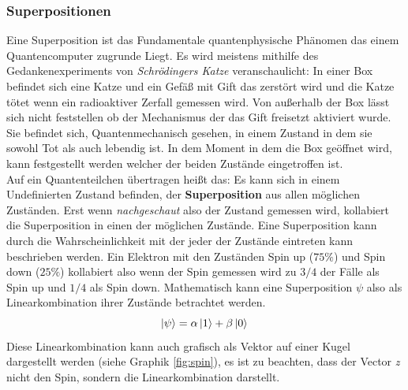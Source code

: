 \subsubsection{Superpositionen}
Eine Superposition ist das Fundamentale quantenphysische Phänomen das einem Quantencomputer zugrunde Liegt.
Es wird meistens mithilfe des Gedankenexperiments von \cite[\$5]{schrodinger_gegenwartige_1935} \textit{Schrödingers Katze} veranschaulicht: In einer Box befindet sich eine Katze und ein Gefäß mit Gift das zerstört wird und die Katze tötet wenn ein radioaktiver Zerfall gemessen wird. Von außerhalb der Box lässt sich nicht feststellen ob der Mechanismus der das Gift freisetzt aktiviert wurde. Sie befindet sich, Quantenmechanisch gesehen, in einem Zustand in dem sie sowohl Tot als auch lebendig ist. In dem Moment in dem die Box geöffnet wird, kann festgestellt werden welcher der beiden Zustände eingetroffen ist.\\
Auf ein Quantenteilchen übertragen heißt das: Es kann sich in einem Undefinierten Zustand befinden, der \textbf{Superposition} aus allen möglichen Zuständen. Erst wenn \textit{nachgeschaut} also der Zustand gemessen wird, kollabiert die Superposition in einen der möglichen Zustände. Eine Superposition kann durch die Wahrscheinlichkeit mit der jeder der Zustände eintreten kann beschrieben werden. Ein Elektron mit den Zuständen Spin up ($75\%$) und Spin down ($25\%$) kollabiert also wenn der Spin gemessen wird zu $3/4$ der Fälle als Spin up und $1/4$ als Spin down.
Mathematisch kann eine Superposition $\psi$ also als Linearkombination ihrer Zustände betrachtet werden. 
\begin{equation}
    \ket{\psi } = \alpha \ket{1} + \beta \ket{0} \\
\end{equation}
Diese Linearkombination kann auch grafisch als Vektor auf einer Kugel dargestellt werden (siehe Graphik \ref{fig:spin}), es ist zu beachten, dass der Vector \textit{z} nicht den Spin, sondern die Linearkombination darstellt.

